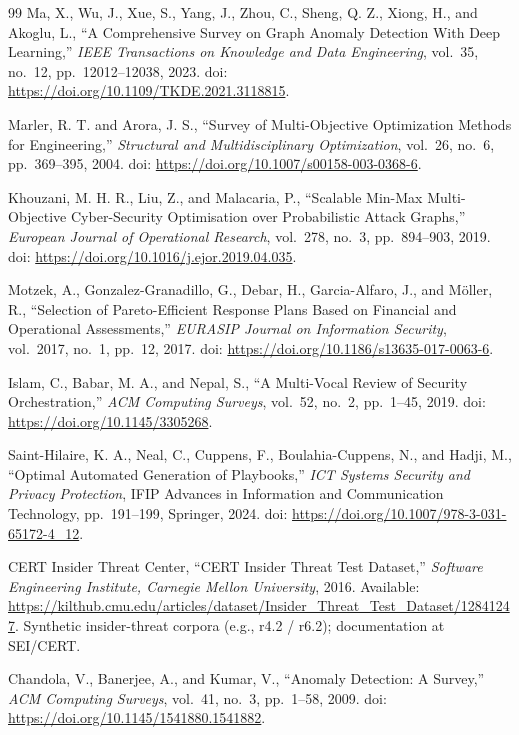 \documentclass[11pt,a4paper,oneside]{report}
\theoremstyle{definition}
\theoremstyle{plain}
\begin{document}
\begin{thebibliography}{99}
Ma, X., Wu, J., Xue, S., Yang, J., Zhou, C., Sheng, Q. Z., Xiong, H., and Akoglu, L., ``A Comprehensive Survey on Graph Anomaly Detection With Deep Learning,'' \emph{IEEE Transactions on Knowledge and Data Engineering}, vol.~35, no.~12, pp.~12012--12038, 2023. doi: \url{https://doi.org/10.1109/TKDE.2021.3118815}.

Marler, R. T. and Arora, J. S., ``Survey of Multi-Objective Optimization Methods for Engineering,'' \emph{Structural and Multidisciplinary Optimization}, vol.~26, no.~6, pp.~369--395, 2004. doi: \url{https://doi.org/10.1007/s00158-003-0368-6}.

Khouzani, M. H. R., Liu, Z., and Malacaria, P., ``Scalable Min-Max Multi-Objective Cyber-Security Optimisation over Probabilistic Attack Graphs,'' \emph{European Journal of Operational Research}, vol.~278, no.~3, pp.~894--903, 2019. doi: \url{https://doi.org/10.1016/j.ejor.2019.04.035}.

Motzek, A., Gonzalez-Granadillo, G., Debar, H., Garcia-Alfaro, J., and M{\"o}ller, R., ``Selection of {Pareto}-Efficient Response Plans Based on Financial and Operational Assessments,'' \emph{EURASIP Journal on Information Security}, vol.~2017, no.~1, pp.~12, 2017. doi: \url{https://doi.org/10.1186/s13635-017-0063-6}.

Islam, C., Babar, M. A., and Nepal, S., ``A Multi-Vocal Review of Security Orchestration,'' \emph{ACM Computing Surveys}, vol.~52, no.~2, pp.~1--45, 2019. doi: \url{https://doi.org/10.1145/3305268}.

Saint-Hilaire, K. A., Neal, C., Cuppens, F., Boulahia-Cuppens, N., and Hadji, M., ``Optimal Automated Generation of Playbooks,'' \emph{ICT Systems Security and Privacy Protection}, IFIP Advances in Information and Communication Technology, pp.~191--199, Springer, 2024. doi: \url{https://doi.org/10.1007/978-3-031-65172-4_12}.

{CERT Insider Threat Center}, ``{CERT} Insider Threat Test Dataset,'' \emph{Software Engineering Institute, Carnegie Mellon University}, 2016. Available: \url{https://kilthub.cmu.edu/articles/dataset/Insider_Threat_Test_Dataset/12841247}. Synthetic insider-threat corpora (e.g., r4.2 / r6.2); documentation at SEI/CERT.

Chandola, V., Banerjee, A., and Kumar, V., ``Anomaly Detection: A Survey,'' \emph{ACM Computing Surveys}, vol.~41, no.~3, pp.~1--58, 2009. doi: \url{https://doi.org/10.1145/1541880.1541882}.


\end{thebibliography}
\end{document}
